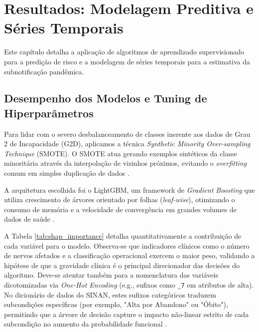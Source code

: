 \chapter{Resultados: Modelagem Preditiva e Séries Temporais}


Este capítulo detalha a aplicação de algoritmos de aprendizado supervisionado para a predição de risco e a modelagem de séries temporais para a estimativa da subnotificação pandêmica.

\section{Desempenho dos Modelos e Tuning de Hiperparâmetros}

Para lidar com o severo desbalanceamento de classes inerente aos dados de Grau 2 de Incapacidade (G2D), aplicamos a técnica \textit{Synthetic Minority Over-sampling Technique} (SMOTE). O SMOTE atua gerando exemplos sintéticos da classe minoritária através da interpolação de vizinhos próximos, evitando o \textit{overfitting} comum em simples duplicação de dados \cite{chawla2002smote}.

A arquitetura escolhida foi o LightGBM, um framework de \textit{Gradient Boosting} que utiliza crescimento de árvores orientado por folhas (\textit{leaf-wise}), otimizando o consumo de memória e a velocidade de convergência em grandes volumes de dados de saúde \cite{ke2017lightgbm}.

\begin{table}[H]
\centering
\caption{Ranking de Importância das Variáveis (SHAP Values)}
\label{tab:shap_importance}
\small

\end{table}

A Tabela \ref{tab:shap_importance} detalha quantitativamente a contribuição de cada variável para o modelo. Observa-se que indicadores clínicos como o número de nervos afetados e a classificação operacional exercem o maior peso, validando a hipótese de que a gravidade clínica é o principal direcionador das decisões do algoritmo. Deve-se atentar também para a nomenclatura das variáveis dicotomizadas via \textit{One-Hot Encoding} (e.g., sufixos como \texttt{\_7} em atributos de alta). No dicionário de dados do SINAN, estes sufixos categóricos traduzem subcondições específicas (por exemplo, "Alta por Abandono" ou "Óbito"), permitindo que a árvore de decisão capture o impacto não-linear estrito de cada subcondição no aumento da probabilidade funcional \cite{scikitlearn_MI_2024}.

